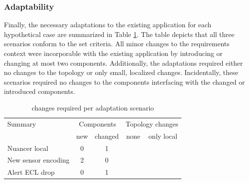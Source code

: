 \subsubsection{Adaptability}
Finally, the necessary adaptations to the existing application for each hypothetical case are summarized in Table \ref{table:adaptations}. The table depicts that all three scenarios conform to the set criteria. All minor changes to the requirements context were incorporable with the existing application by introducing or changing at most two components. Additionally, the adaptations required either no changes to the topology or only small, localized changes. Incidentally, these scenarios required no changes to the components interfacing with the changed or introduced components.

\begin{table}
\centering
\begin{tabular}{|l||c|c||c|c|} \hline
Summary				& \multicolumn{2}{c||}{Components}		& \multicolumn{2}{c|}{Topology changes} \\
					& new 	& changed 	& none 		& only local  \\ \hline
Nuancer local		& 0		& 1			&			& \cmark \\ \hline
New sensor encoding	& 2		& 0			& 			& \cmark \\ \hline
Alert ECL drop		& 0		& 1			& \cmark	&		 \\ \hline
\end{tabular}
\caption{changes required per adaptation scenario}
\label{table:adaptations}
\end{table}


